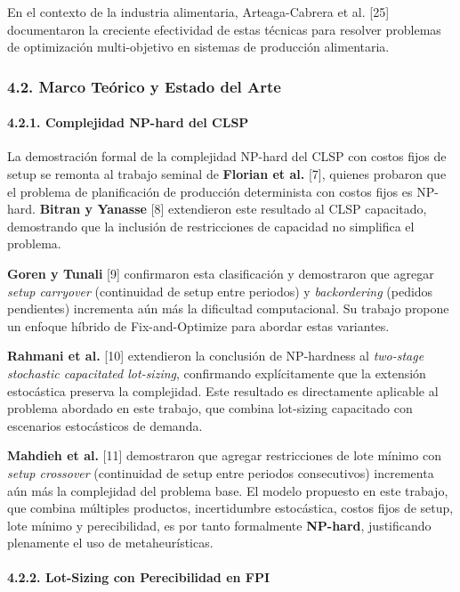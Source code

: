 \documentclass[
  spanish,
  12pt,
]{article}
\begin{document}
En el contexto de la industria alimentaria, Arteaga-Cabrera et al.
{[}25{]} documentaron la creciente efectividad de estas técnicas para
resolver problemas de optimización multi-objetivo en sistemas de
producción alimentaria.

\subsubsection{4.2. Marco Teórico y Estado del
Arte}\label{marco-teuxf3rico-y-estado-del-arte}

\paragraph{4.2.1. Complejidad NP-hard del
CLSP}\label{complejidad-np-hard-del-clsp}

La demostración formal de la complejidad NP-hard del CLSP con costos
fijos de setup se remonta al trabajo seminal de \textbf{Florian et al.}
{[}7{]}, quienes probaron que el problema de planificación de producción
determinista con costos fijos es NP-hard. \textbf{Bitran y Yanasse}
{[}8{]} extendieron este resultado al CLSP capacitado, demostrando que
la inclusión de restricciones de capacidad no simplifica el problema.

\textbf{Goren y Tunali} {[}9{]} confirmaron esta clasificación y
demostraron que agregar \emph{setup carryover} (continuidad de setup
entre periodos) y \emph{backordering} (pedidos pendientes) incrementa
aún más la dificultad computacional. Su trabajo propone un enfoque
híbrido de Fix-and-Optimize para abordar estas variantes.

\textbf{Rahmani et al.} {[}10{]} extendieron la conclusión de
NP-hardness al \emph{two-stage stochastic capacitated lot-sizing},
confirmando explícitamente que la extensión estocástica preserva la
complejidad. Este resultado es directamente aplicable al problema
abordado en este trabajo, que combina lot-sizing capacitado con
escenarios estocásticos de demanda.

\textbf{Mahdieh et al.} {[}11{]} demostraron que agregar restricciones
de lote mínimo con \emph{setup crossover} (continuidad de setup entre
periodos consecutivos) incrementa aún más la complejidad del problema
base. El modelo propuesto en este trabajo, que combina múltiples
productos, incertidumbre estocástica, costos fijos de setup, lote mínimo
y perecibilidad, es por tanto formalmente \textbf{NP-hard}, justificando
plenamente el uso de metaheurísticas.

\paragraph{4.2.2. Lot-Sizing con Perecibilidad en
FPI}\label{lot-sizing-con-perecibilidad-en-fpi}
\end{document}
